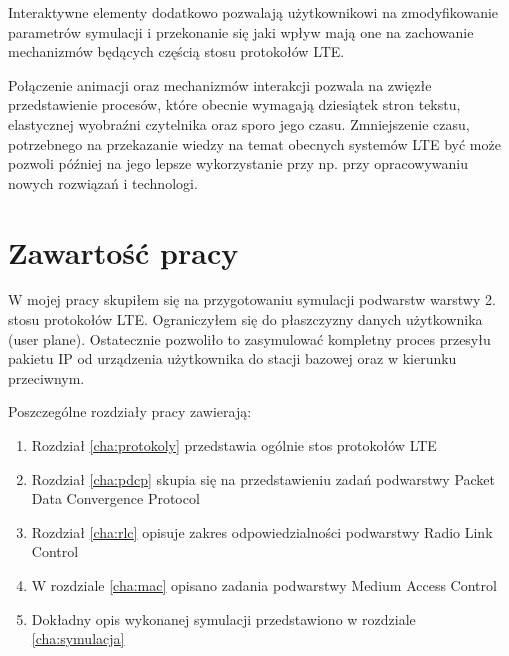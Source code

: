 Interaktywne elementy dodatkowo pozwalają użytkownikowi na zmodyfikowanie parametrów symulacji i przekonanie się jaki wpływ mają one na zachowanie mechanizmów będących częścią stosu protokołów LTE.

Połączenie animacji oraz mechanizmów interakcji pozwala na zwięzłe przedstawienie procesów, które obecnie wymagają dziesiątek stron tekstu, elastycznej wyobraźni czytelnika oraz sporo jego czasu. Zmniejszenie czasu, potrzebnego na przekazanie wiedzy na temat obecnych systemów LTE być może pozwoli później na jego lepsze wykorzystanie przy np. przy opracowywaniu nowych rozwiązań i technologi.

\section{Zawartość pracy}
\label{sec:zawartoscPracy}

W mojej pracy skupiłem się na przygotowaniu symulacji podwarstw warstwy 2. stosu protokołów LTE. Ograniczyłem się do płaszczyzny danych użytkownika (user plane). Ostatecznie pozwoliło to zasymulować kompletny proces przesyłu pakietu IP od urządzenia użytkownika do stacji bazowej oraz w kierunku przeciwnym.

Poszczególne rozdziały pracy zawierają:

\begin{enumerate}%

\item Rozdział \ref{cha:protokoly} przedstawia ogólnie stos protokołów LTE
\item Rozdział \ref{cha:pdcp} skupia się na przedstawieniu zadań podwarstwy Packet Data Convergence Protocol
\item Rozdział \ref{cha:rlc} opisuje zakres odpowiedzialności podwarstwy Radio Link Control
\item W rozdziale \ref{cha:mac} opisano zadania podwarstwy Medium Access Control\item Dokładny opis wykonanej symulacji przedstawiono w rozdziale \ref{cha:symulacja}

\end{enumerate}

